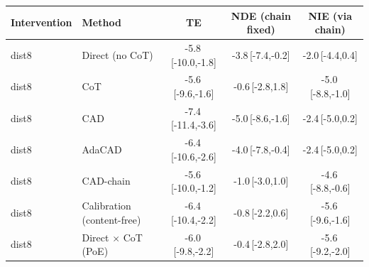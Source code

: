 \begin{tabular}{llccc}
\toprule
Intervention & Method & TE & NDE (chain fixed) & NIE (via chain) \\
\midrule
dist8 & Direct (no CoT) & -5.8\,{\scriptsize[-10.0,-1.8]} & -3.8\,{\scriptsize[-7.4,-0.2]} & -2.0\,{\scriptsize[-4.4,0.4]} \\
dist8 & CoT & -5.6\,{\scriptsize[-9.6,-1.6]} & -0.6\,{\scriptsize[-2.8,1.8]} & -5.0\,{\scriptsize[-8.8,-1.0]} \\
dist8 & CAD & -7.4\,{\scriptsize[-11.4,-3.6]} & -5.0\,{\scriptsize[-8.6,-1.6]} & -2.4\,{\scriptsize[-5.0,0.2]} \\
dist8 & AdaCAD & -6.4\,{\scriptsize[-10.6,-2.6]} & -4.0\,{\scriptsize[-7.8,-0.4]} & -2.4\,{\scriptsize[-5.0,0.2]} \\
dist8 & CAD-chain & -5.6\,{\scriptsize[-10.0,-1.2]} & -1.0\,{\scriptsize[-3.0,1.0]} & -4.6\,{\scriptsize[-8.8,-0.6]} \\
dist8 & Calibration (content-free) & -6.4\,{\scriptsize[-10.4,-2.2]} & -0.8\,{\scriptsize[-2.2,0.6]} & -5.6\,{\scriptsize[-9.6,-1.6]} \\
dist8 & Direct $\times$ CoT (PoE) & -6.0\,{\scriptsize[-9.8,-2.2]} & -0.4\,{\scriptsize[-2.8,2.0]} & -5.6\,{\scriptsize[-9.2,-2.0]} \\
\bottomrule
\end{tabular}
